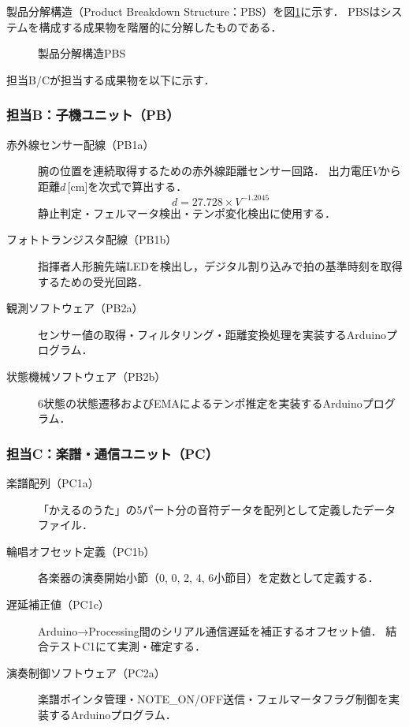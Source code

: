 製品分解構造（Product Breakdown Structure：PBS）を図\ref{fig:pbs}に示す．
PBSはシステムを構成する成果物を階層的に分解したものである．

\begin{figure}[H]
  \centering
  \caption{製品分解構造PBS}
  \label{fig:pbs}
\end{figure}

担当B/Cが担当する成果物を以下に示す．

\subsubsection*{担当B：子機ユニット（PB）}
\begin{description}
  \item[赤外線センサー配線（PB1a）]
    腕の位置を連続取得するための赤外線距離センサー回路．
    出力電圧$V$から距離$d$\,[cm]を次式で算出する．
    \begin{equation}
      d = 27.728 \times V^{-1.2045}
    \end{equation}
    静止判定・フェルマータ検出・テンポ変化検出に使用する．
  \item[フォトトランジスタ配線（PB1b）]
    指揮者人形腕先端LEDを検出し，デジタル割り込みで拍の基準時刻を取得するための受光回路．
  \item[観測ソフトウェア（PB2a）]
    センサー値の取得・フィルタリング・距離変換処理を実装するArduinoプログラム．
  \item[状態機械ソフトウェア（PB2b）]
    6状態の状態遷移およびEMAによるテンポ推定を実装するArduinoプログラム．
\end{description}

\subsubsection*{担当C：楽譜・通信ユニット（PC）}
\begin{description}
  \item[楽譜配列（PC1a）]
    「かえるのうた」の5パート分の音符データを配列として定義したデータファイル．
  \item[輪唱オフセット定義（PC1b）]
    各楽器の演奏開始小節（0, 0, 2, 4, 6小節目）を定数として定義する．
  \item[遅延補正値（PC1c）]
    Arduino→Processing間のシリアル通信遅延を補正するオフセット値．
    結合テストC1にて実測・確定する．
  \item[演奏制御ソフトウェア（PC2a）]
    楽譜ポインタ管理・NOTE\_ON/OFF送信・フェルマータフラグ制御を実装するArduinoプログラム．
\end{description}

